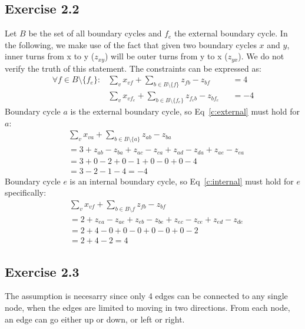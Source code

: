 \subsection{Exercise 2.2}
Let $B$ be the set of all boundary cycles and $f_e$ the external boundary
cycle. In the following, we make use of the fact that given two boundary cycles
$x$ and $y$, inner turns from x to y ($z_{xy}$) will be outer turns from y to x
($z_{yx}$). We do not verify the truth of this statement.  The constraints can
be expressed as:
\begin{align}
  \forall f \in B\setminus \{f_e\} : & \sum_{v} x_{vf} + \sum_{b\in B\setminus \{f\}} z_{fb} - z_{bf} &&= 4
    \label{c:internal} \\
  & \sum_{v} x_{v f_e} + \sum_{b\in B\setminus \{f_e\}} z_{f_e b} - z_{b f_e} &&= -4
    \label{c:external}
\end{align}
Boundary cycle $a$ is the external boundary cycle, so Eq~\ref{c:external} must
hold for $a$:
\begin{align*}
  &   \sum_{v} x_{v a} + \sum_{b\in B\setminus \{a\}} z_{a b} - z_{b a} \\
  &=  3 + z_{ab} - z_{ba} + z_{ac} - z_{ca} + z_{ad} - z_{da} + z_{ae} - z_{ea} \\
  &=  3 + 0 - 2 + 0 - 1 + 0 - 0 + 0 - 4 \\
  &=  3 - 2 - 1 - 4 = -4
\end{align*}
Boundary cycle $e$ is an internal boundary cycle, so Eq~\ref{c:internal} must
hold for $e$ specifically:
\begin{align*}
  & \sum_{v} x_{vf} + \sum_{b\in B\setminus f} z_{fb} - z_{bf} \\
  &= 2 + z_{ea} - z_{ae} + z_{eb} - z_{be} + z_{ec} - z_{ce} + z_{ed} - z_{de} \\
  &= 2 + 4 - 0 + 0 - 0 + 0 - 0 + 0 - 2 \\
  &= 2 + 4 - 2 = 4
\end{align*}
\subsection{Exercise 2.3}
The assumption is necesarry since only 4 edges can be connected to any single
node, when the edges are limited to moving in two directions. From each node, an
edge can go either up or down, or left or right.

